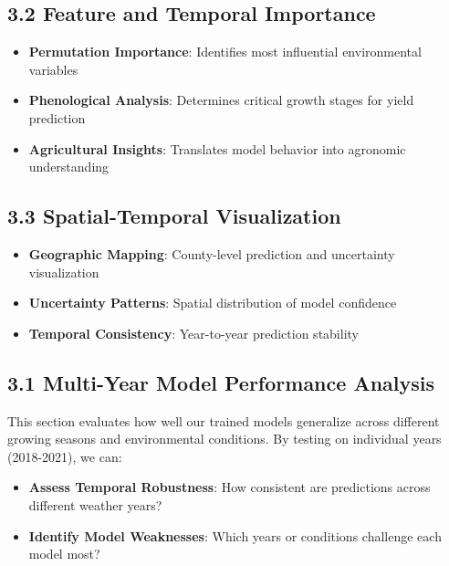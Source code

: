 \documentclass[
  letterpaper,
  DIV=11,
  numbers=noendperiod]{scrreprt}
\providecommand{\tightlist}{%
  \setlength{\itemsep}{0pt}\setlength{\parskip}{0pt}}\usepackage{longtable,booktabs,array}
\begin{document}
\subsection{3.2 Feature and Temporal
Importance}\label{feature-and-temporal-importance}

\begin{itemize}
\tightlist
\item
  \textbf{Permutation Importance}: Identifies most influential
  environmental variables
\item
  \textbf{Phenological Analysis}: Determines critical growth stages for
  yield prediction
\item
  \textbf{Agricultural Insights}: Translates model behavior into
  agronomic understanding
\end{itemize}

\subsection{3.3 Spatial-Temporal
Visualization}\label{spatial-temporal-visualization}

\begin{itemize}
\tightlist
\item
  \textbf{Geographic Mapping}: County-level prediction and uncertainty
  visualization
\item
  \textbf{Uncertainty Patterns}: Spatial distribution of model
  confidence
\item
  \textbf{Temporal Consistency}: Year-to-year prediction stability
\end{itemize}

\subsection{3.1 Multi-Year Model Performance
Analysis}\label{multi-year-model-performance-analysis}

This section evaluates how well our trained models generalize across
different growing seasons and environmental conditions. By testing on
individual years (2018-2021), we can:

\begin{itemize}
\tightlist
\item
  \textbf{Assess Temporal Robustness}: How consistent are predictions
  across different weather years?
\item
  \textbf{Identify Model Weaknesses}: Which years or conditions
  challenge each model most?
\end{itemize}
\end{document}
